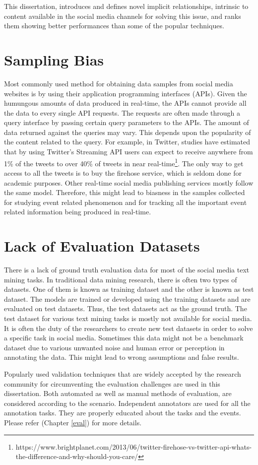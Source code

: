 This dissertation, introduces and defines novel implicit relationships, intrinsic to content available in the social media channels for solving this issue, and ranks them showing better performances than some of the popular techniques.  


\section{Sampling Bias\label{samplingBias}}
Most commonly used method for obtaining data samples from social media websites is by using their application programming interfaces (APIs). Given the humungous amounts of data produced in real-time, the APIs cannot provide all the data to every single API requests. The requests are often made through a query interface by passing certain query parameters to the APIs. The amount of data returned against the queries may vary. This depends upon the popularity of the content related to the query. For example, in Twitter, studies have estimated that by using Twitter's Streaming API users can expect to receive anywhere from 1\% of the tweets to over 40\% of tweets in near real-time\footnote{https://www.brightplanet.com/2013/06/twitter-firehose-vs-twitter-api-whats-the-difference-and-why-should-you-care/}. The only way to get access to all the tweets is to buy the firehose service, which is seldom done for academic purposes. Other real-time social media publishing services mostly follow the same model. Therefore, this might lead to biasness in the samples collected for studying event related phenomenon and for tracking all the important event related information being produced in real-time.


\section{Lack of Evaluation Datasets}
There is a lack of ground truth evaluation data for most of the social media text mining tasks. In traditional data mining research, there is often two types of datasets. One of them is known as training dataset and the other is known as test dataset. The models are trained or developed using the training datasets and are evaluated on test datasets. Thus, the test datasets act as the ground truth. The test dataset for various text mining tasks is mostly not available for social media. It is often the duty of the researchers to create new test datasets in order to solve a specific task in social media. Sometimes this data might not be a benchmark dataset due to various unwanted noise and human error or perception in annotating the data. This might lead to wrong assumptions and false results.

Popularly used validation techniques that are widely accepted by the research community for circumventing the evaluation challenges are used in this dissertation. Both automated as well as manual methods of evaluation, are considered according to the scenario. Independent annotators are used for all the annotation tasks. They are properly educated about the tasks and the events. Please refer (Chapter \ref{eval}) for more details.
